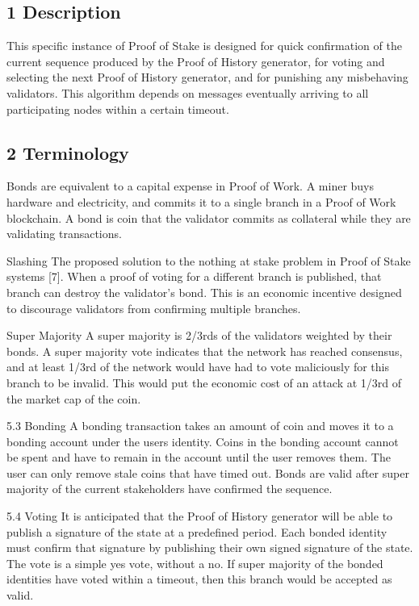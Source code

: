 \documentclass[11pt]{article}
\begin{document}
\subsection{1 Description}

This specific instance of Proof of Stake is designed for quick confirmation of the current sequence produced by the Proof of History generator, for voting and selecting the next Proof of History generator, and for punishing any misbehaving validators. This algorithm depends on messages eventually arriving to all participating nodes within a certain timeout.


\subsection{2 Terminology}

Bonds are equivalent to a capital expense in Proof of Work. A miner buys hardware and electricity, and commits it to a single branch in a Proof of Work blockchain. A bond is coin that the validator commits as collateral while they are validating transactions.


Slashing The proposed solution to the nothing at stake problem in Proof of Stake systems [7]. When a proof of voting for a different branch is published, that branch can destroy the validator's bond. This is an economic incentive designed to discourage validators from confirming multiple branches.


Super Majority A super majority is 2/3rds of the validators weighted by their bonds. A super majority vote indicates that the network has reached consensus, and at least 1/3rd of the network would have had to vote maliciously for this branch to be invalid. This would put the economic cost of an attack at 1/3rd of the market cap of the coin.


5.3 Bonding A bonding transaction takes an amount of coin and moves it to a bonding account under the users identity. Coins in the bonding account cannot be spent and have to remain in the account until the user removes them. The user can only remove stale coins that have timed out. Bonds are valid after super majority of the current stakeholders have confirmed the sequence.


5.4 Voting It is anticipated that the Proof of History generator will be able to publish a signature of the state at a predefined period. Each bonded identity must confirm that signature by publishing their own signed signature of the state. The vote is a simple yes vote, without a no. If super majority of the bonded identities have voted within a timeout, then this branch would be accepted as valid.
\end{document}
